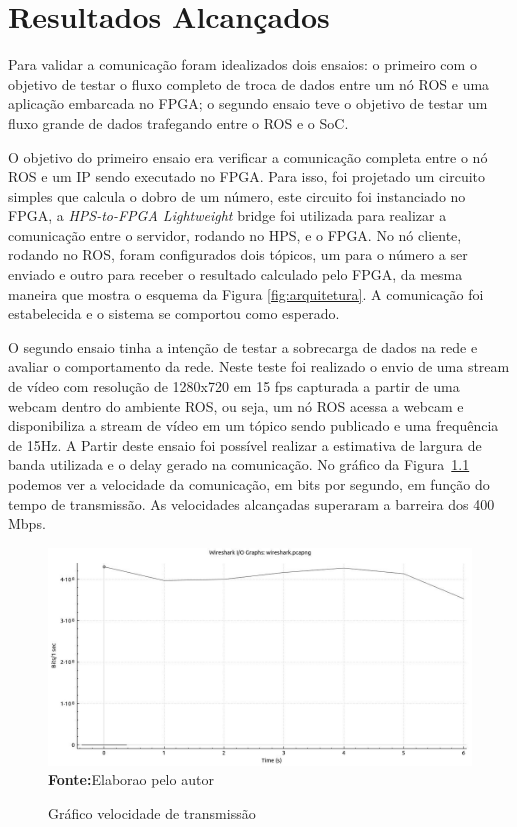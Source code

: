 \chapter{Resultados Alcançados}\label{cap:result}

Para validar a comunicação foram idealizados dois ensaios: o primeiro com o objetivo de testar o fluxo completo de troca de dados entre um nó ROS e uma aplicação embarcada no FPGA; o segundo ensaio teve o objetivo de testar um fluxo grande de dados trafegando entre o ROS e o SoC.

O objetivo do primeiro ensaio era verificar a comunicação completa entre o nó ROS e um IP sendo executado no FPGA. Para isso,  foi projetado um circuito simples que calcula o dobro de um número,  este circuito foi instanciado no FPGA, a \textit{HPS-to-FPGA Lightweight} bridge foi utilizada para realizar a comunicação entre o servidor, rodando no HPS, e o FPGA. No nó cliente, rodando no ROS, foram configurados dois tópicos, um para o número a ser enviado e outro para receber o resultado calculado pelo FPGA, da mesma maneira que mostra o esquema da Figura \ref{fig:arquitetura}. A comunicação foi estabelecida e o sistema se comportou como esperado.

O segundo ensaio tinha a intenção de testar a sobrecarga de dados na rede e avaliar o comportamento da rede. Neste teste foi realizado o envio de uma stream de vídeo com resolução de 1280x720 em 15 fps capturada a partir de uma webcam dentro do ambiente ROS, ou seja, um nó ROS acessa a webcam e disponibiliza a stream de vídeo em um tópico sendo publicado e uma frequência de 15Hz. A Partir deste ensaio foi possível realizar a estimativa de largura de banda utilizada e o delay gerado na comunicação. No gráfico da Figura~\ref{fig:speed} podemos ver a velocidade da comunicação, em bits por segundo, em função do tempo de transmissão. As velocidades alcançadas superaram a barreira dos 400 Mbps.

\begin{figure}[ht]
	\caption{Gráfico velocidade de transmissão}
	\begin{center}
		\includegraphics[scale=0.42]{imagens/speed.jpg}\\
		{\small \textbf{Fonte:}Elaborao pelo autor}
    \end{center}\label{fig:speed}
\end{figure}

